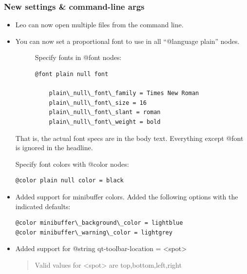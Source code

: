 \documentclass[a4paper,10pt,english]{sphinxmanual}
\begin{document}
\subsubsection{New settings \& command-line args}
\label{what-is-new:new-settings-command-line-args}\begin{itemize}
\item {} 
Leo can now open multiple files from the command line.

\item {} \begin{description}
\item[{You can now set a proportional font to use in all ``@language plain'' nodes.}] \leavevmode
Specify fonts in @font nodes:

\begin{Verbatim}[commandchars=\\\{\}]
@font plain null font

    plain\_null\_font\_family = Times New Roman
    plain\_null\_font\_size = 16
    plain\_null\_font\_slant = roman
    plain\_null\_font\_weight = bold
\end{Verbatim}

\end{description}

That is, the actual font specs are in the body text.  Everything
except @font is ignored in the headline.

Specify font colors with @color nodes:

\begin{Verbatim}[commandchars=\\\{\}]
@color plain null color = black
\end{Verbatim}

\item {} 
Added support for minibuffer colors. Added the following options with the
indicated defaults:

\begin{Verbatim}[commandchars=\\\{\}]
@color minibuffer\_background\_color = lightblue
@color minibuffer\_warning\_color = lightgrey
\end{Verbatim}

\item {} 
Added support for @string qt-toolbar-location = \textless{}spot\textgreater{}
\begin{quote}

Valid values for \textless{}spot\textgreater{} are top,bottom,left,right
\end{quote}


\end{itemize}
\end{document}
